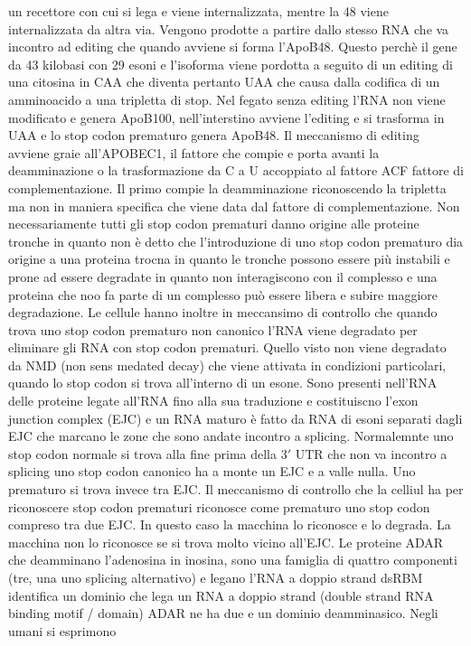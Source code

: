 un recettore con cui si lega e viene internalizzata, mentre la 48 viene internalizzata da altra via. Vengono prodotte a partire dallo stesso RNA che va incontro ad editing che 
quando avviene si forma l'ApoB48. Questo perch\`e il gene da 43 kilobasi con 29 esoni e l'isoforma viene pordotta a seguito di un editing di una citosina in CAA che diventa pertanto UAA
che causa dalla codifica di un amminoacido a una tripletta di stop. Nel fegato senza editing l'RNA non viene modificato e genera ApoB100, nell'interstino avviene l'editing e si 
trasforma in UAA e lo stop codon prematuro genera ApoB48. Il meccanismo di editing avviene graie all'APOBEC1, il fattore che compie e porta avanti la deamminazione o la trasformazione
da C a U accoppiato al fattore ACF fattore di complementazione. Il primo compie la deamminazione riconoscendo la tripletta ma non in maniera specifica che viene data dal fattore di 
complementazione. Non necessariamente tutti gli stop codon prematuri danno origine alle proteine tronche in quanto non \`e detto che l'introduzione di uno stop codon prematuro dia
origine a una proteina trocna in quanto le tronche possono essere pi\`u instabili e prone ad essere degradate in quanto non interagiscono con il complesso e una proteina che noo fa 
parte di un complesso pu\`o essere libera e subire maggiore degradazione. Le cellule hanno inoltre in meccansimo di controllo che quando trova uno stop codon prematuro non canonico l'RNA
viene degradato per eliminare gli RNA con stop codon prematuri. Quello visto non viene degradato da NMD  (non sens medated decay) che viene attivata in condizioni particolari, quando 
lo stop codon si trova all'interno di un esone. Sono presenti nell'RNA delle proteine legate all'RNA fino alla sua traduzione e costituiscno l'exon junction complex (EJC) e un RNA 
maturo \`e fatto da RNA di esoni separati dagli EJC che marcano le zone che sono andate incontro a splicing. Normalemnte uno stop codon normale si trova alla fine prima della $3'$ UTR
che non va incontro a splicing uno stop codon canonico ha a monte un EJC e a valle nulla. Uno prematuro si trova invece tra EJC. Il meccanismo di controllo che la celliul ha per 
riconoscere stop codon prematuri riconosce come prematuro uno stop codon compreso tra due EJC. In questo caso la macchina lo riconosce e lo degrada. La macchina non lo riconosce 
se si trova molto vicino all'EJC. Le proteine ADAR che deamminano l'adenosina in inosina, sono una famiglia di quattro componenti (tre, una uno splicing alternativo) e legano l'RNA a
doppio strand dsRBM identifica un dominio che lega un RNA a doppio strand (double strand RNA binding motif / domain) ADAR ne ha due e un dominio deamminasico. Negli umani si esprimono
